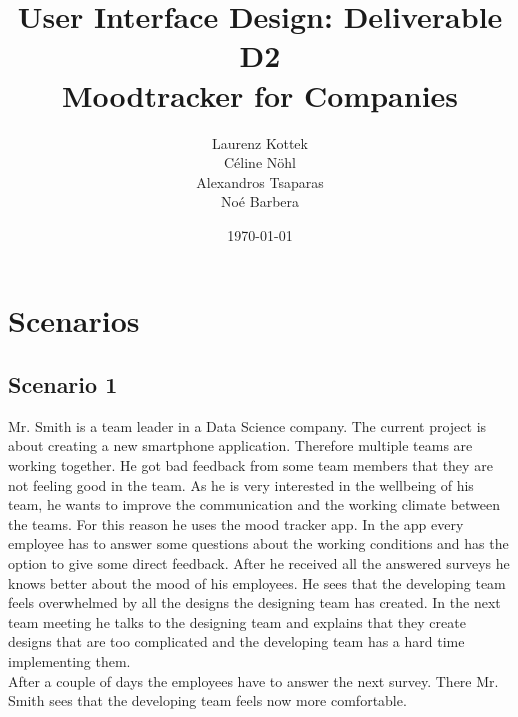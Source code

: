 \documentclass[11pt]{article}
\title{\textbf{User Interface Design: Deliverable D2}\\Moodtracker for Companies}
\author{Laurenz Kottek\\ Céline Nöhl\\ Alexandros Tsaparas\\ Noé Barbera}
\date{\today}
\begin{document}
{}
\maketitle 

\vspace{15mm}


\tableofcontents
\newpage


\section{Scenarios}

\subsection{Scenario 1}
Mr. Smith is a team leader in a Data Science company. The current project is about creating a new smartphone application. Therefore multiple teams are working together. He got bad feedback from some team members that they are not feeling good in the team. As he is very interested in the wellbeing of his team, he wants to improve the communication and the working climate between the teams. For this reason he uses the mood tracker app. In the app every employee has to answer some questions about the working conditions and has the option to give some direct feedback. After he received all the answered surveys he knows better about the mood of his employees. He sees that the developing team feels overwhelmed by all the designs the designing team has created. In the next team meeting he talks to the designing team and explains that they create designs that are too complicated and the developing team has a hard time implementing them. \\
After a couple of days the employees have to answer the next survey. There Mr. Smith sees that the developing team feels now more comfortable. 
\end{document}
